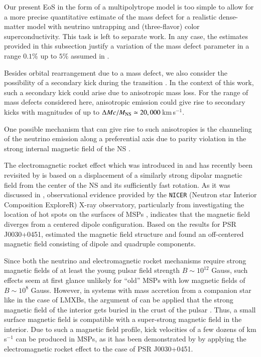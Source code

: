 \documentclass[main.tex]{subfiles}
\begin{document}
    Our present EoS in the form of a multipolytrope model is too simple to allow for a more precise quantitative estimate of the mass defect  for a realistic dense-matter model with neutrino untrapping and (three-flavor) color superconductivity. This task is left to separate work.
    In any case, the estimates provided in this subsection justify a variation of the mass defect parameter in a range $0.1\%$ up to $5\%$ assumed in \cite{Jiang:apj15} \citep[see also][]{Jiang:raa2021}.
    
    Besides orbital rearrangement due to a mass defect, we also consider the possibility of a secondary kick during the transition \citep{Hobbs:2005yx,Bombaci:2004nu}. 
    In the context of this work, such a secondary kick could arise due to anisotropic mass loss. 
    For the range of mass defects considered here, anisotropic emission could give rise to secondary kicks with magnitudes of up to $\Delta M c / M _{\rm NS} \simeq 20,000$\,km\,s$^{-1}$. 
    
    One possible mechanism that can give rise to such anisotropies is the channeling of the neutrino emission along a preferential axis due to parity violation in the strong internal magnetic field of the NS  \citep[see][for recent examples with typical B-field strengths of $B\sim 10^{12}$ Gauss]{Berdermann:2006rk,Kaminski:2014jda,Fukushima:2024cpg}. 
    
    The electromagnetic rocket effect which was introduced in \cite{1975ApJ...201..447H} and has recently been revisited by \cite{Agalianou:2023lvv} is based on a displacement of a similarly strong dipolar magnetic field from the center of the NS and its sufficiently fast rotation.
    As it was discussed in \cite{Agalianou:2023lvv}, observational evidence provided by the \texttt{NICER} (Neutron star Interior Composition ExploreR) X-ray observatory, particularly from investigating the location of hot spots on the surfaces of MSPs \citep{Miller:2019cac, Riley:2019yda}, indicates that the magnetic field diverges from a centered dipole configuration.
     Based on the results for PSR J0030+0451, \cite{Kalapotharakos:2020rmz} estimated the magnetic field structure and found an off-centered magnetic field consisting of dipole and quadruple components. 
    
    Since both the neutrino and electromagnetic rocket mechanisms require strong magnetic fields of at least the young pulsar field strength $B\sim 10^{12}$ Gauss, such effects seem at first glance unlikely for ``old'' MSPs with low magnetic fields of
    $B\sim 10^{8}$ Gauss.
    However, in systems with mass accretion from a companion star like in the case of LMXBs, the argument of \cite{1989ApJ...346..847C} can be applied that the strong magnetic field of the interior gets buried in the crust of the pulsar \citep[e.g.,][and references therein]{Bhattacharya:1991pre, 2001ApJ...557..958C, 10.1111/j.1365-2966.2004.07397.x}.
    Thus, a small surface magnetic field is compatible with a super-strong magnetic field in the interior. 
    Due to such a magnetic field profile, kick velocities of a few dozens of km s$^{-1}$ can be produced in MSPs, as it has been demonstrated by \cite{Agalianou:2023lvv} by applying the electromagnetic rocket effect to the case of PSR J0030+0451.
    
\end{document}
